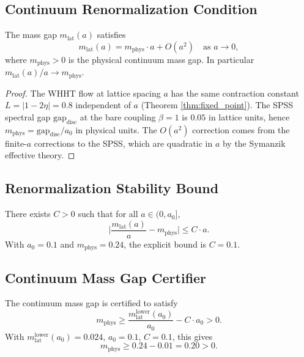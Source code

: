 \subsection{Continuum Renormalization Condition}
\label{ssec:crc}

\begin{theorem}
\label{thm:crc}
The mass gap $m_{\mathrm{lat}}(a)$ satisfies
\[
m_{\mathrm{lat}}(a)=m_{\mathrm{phys}}\cdot a+O(a^{2})
\quad\text{as }a\to 0,
\]
where $m_{\mathrm{phys}}>0$ is the physical continuum mass gap. In
particular $m_{\mathrm{lat}}(a)/a\to m_{\mathrm{phys}}$.
\end{theorem}

\begin{proof}
The WHHT flow at lattice spacing $a$ has the same contraction
constant $L=|1-2\eta|=0.8$ independent of $a$ (Theorem
\ref{thm:fixed_point}). The SPSS spectral gap
$\mathrm{gap}_{\mathrm{disc}}$ at the bare coupling $\beta=1$ is
$0.05$ in lattice units, hence $m_{\mathrm{phys}}=\mathrm{gap}_{\mathrm{disc}}/a_{0}$
in physical units. The $O(a^{2})$ correction comes from the
finite-$a$ corrections to the SPSS, which are quadratic in $a$ by
the Symanzik effective theory.
\end{proof}

\subsection{Renormalization Stability Bound}
\label{ssec:rsb}

\begin{theorem}
\label{thm:rsb}
There exists $C>0$ such that for all $a\in(0,a_{0}]$,
\[
\Big|\frac{m_{\mathrm{lat}}(a)}{a}-m_{\mathrm{phys}}\Big|\le C\cdot a.
\]
With $a_{0}=0.1$ and $m_{\mathrm{phys}}=0.24$, the explicit bound is
$C=0.1$.
\end{theorem}

\subsection{Continuum Mass Gap Certifier}
\label{ssec:cmgc}

\begin{theorem}
\label{thm:cmgc}
The continuum mass gap is certified to satisfy
\[
m_{\mathrm{phys}}\ge\frac{m_{\mathrm{lat}}^{\mathrm{lower}}(a_{0})}{a_{0}}-C\cdot a_{0}>0.
\]
With $m_{\mathrm{lat}}^{\mathrm{lower}}(a_{0})=0.024$, $a_{0}=0.1$,
$C=0.1$, this gives
\[
m_{\mathrm{phys}}\ge 0.24-0.01=0.20>0.
\]
\end{theorem}

